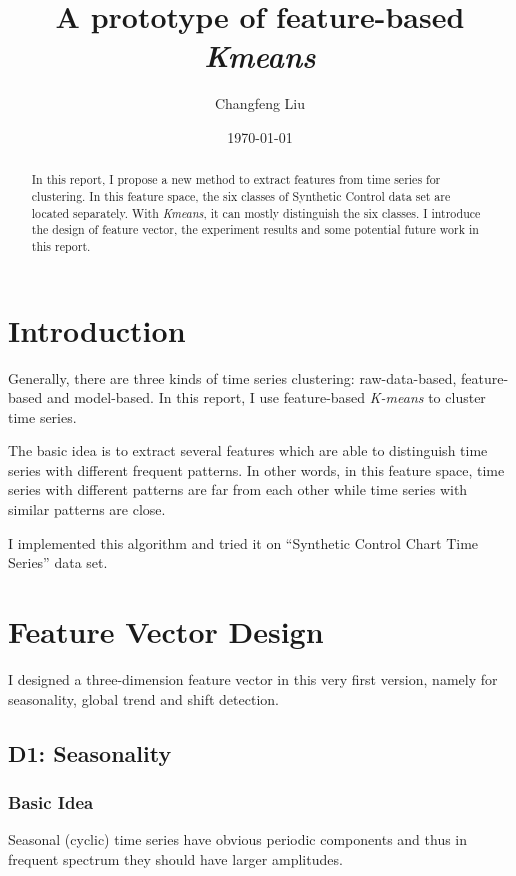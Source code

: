 \documentclass[a4paper]{article}
\title{A prototype of feature-based \emph{Kmeans}}
\author{Changfeng Liu}
\date{\today}
\begin{document}
\maketitle

\begin{abstract}
In this report, I propose a new method to extract features from time series for clustering. In this feature space, the six classes of Synthetic Control\cite{dataset} data set are located separately. With \emph{Kmeans}, it can mostly distinguish the six classes. I introduce the design of feature vector, the experiment results and some potential future work in this report.
\end{abstract}

\setcounter{tocdepth}{2}
\tableofcontents

\newpage
\section{Introduction}
Generally, there are three kinds of time series clustering: raw-data-based, feature-based and model-based\cite{survey}. In this report, I use feature-based \emph{K-means} to cluster time series. 

The basic idea is to extract several features which are able to distinguish time series with different frequent patterns. In other words, in this feature space, time series with different patterns are far from each other while time series with similar patterns are close.

I implemented this algorithm and tried it on ``Synthetic Control Chart Time Series''\cite{dataset} data set.

\section{Feature Vector Design}
I designed a three-dimension feature vector in this very first version, namely for seasonality, global trend and shift detection.

\subsection{D1: Seasonality}
\subsubsection{Basic Idea}
Seasonal (cyclic) time series have obvious periodic components and thus in frequent spectrum they should have larger amplitudes.
\end{document}
